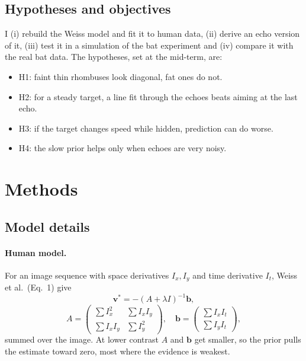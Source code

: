 \documentclass[10pt,twocolumn]{article}
\begin{document}
\subsection{Hypotheses and objectives}
I (i) rebuild the Weiss model and fit it to human data, (ii) derive an echo version of it, (iii) test it in a simulation of the bat experiment and (iv) compare it with the real bat data. The hypotheses, set at the mid-term, are:
\begin{itemize}[nosep]
\item H1: faint thin rhombuses look diagonal, fat ones do not.
\item H2: for a steady target, a line fit through the echoes beats aiming at the last echo.
\item H3: if the target changes speed while hidden, prediction can do worse.
\item H4: the slow prior helps only when echoes are very noisy.
\end{itemize}

\section{Methods}
\subsection{Model details}
\paragraph{Human model.} For an image sequence with space derivatives $I_x, I_y$ and time derivative $I_t$, Weiss et al.\ (Eq.~1) give
\begin{equation}
\mathbf{v}^* = -(A+\lambda I)^{-1}\mathbf{b},
\label{eq:weiss}
\end{equation}
\[
A=\begin{pmatrix}\sum I_x^2 & \sum I_xI_y\\ \sum I_xI_y & \sum I_y^2\end{pmatrix},\quad
\mathbf{b}=\begin{pmatrix}\sum I_xI_t\\ \sum I_yI_t\end{pmatrix},
\]
summed over the image. At lower contrast $A$ and $\mathbf{b}$ get smaller, so the prior pulls the estimate toward zero, most where the evidence is weakest.
\end{document}
